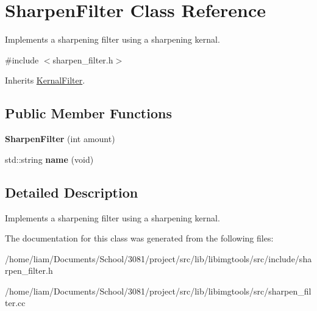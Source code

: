 \hypertarget{classSharpenFilter}{}\section{Sharpen\+Filter Class Reference}
\label{classSharpenFilter}


Implements a sharpening filter using a sharpening kernal.  




{\ttfamily \#include $<$sharpen\+\_\+filter.\+h$>$}



Inherits \hyperlink{classKernalFilter}{Kernal\+Filter}.

\subsection*{Public Member Functions}
\begin{DoxyCompactItemize}
\item 
{\bfseries Sharpen\+Filter} (int amount)\hypertarget{classSharpenFilter_a38c0d866df1c39cfef3e0011dfbc0119}{}\label{classSharpenFilter_a38c0d866df1c39cfef3e0011dfbc0119}

\item 
std\+::string {\bfseries name} (void)\hypertarget{classSharpenFilter_ae58f07217d5be27c357364a935b3af2c}{}\label{classSharpenFilter_ae58f07217d5be27c357364a935b3af2c}

\end{DoxyCompactItemize}


\subsection{Detailed Description}
Implements a sharpening filter using a sharpening kernal. 

The documentation for this class was generated from the following files\+:\begin{DoxyCompactItemize}
\item 
/home/liam/\+Documents/\+School/3081/project/src/lib/libimgtools/src/include/sharpen\+\_\+filter.\+h\item 
/home/liam/\+Documents/\+School/3081/project/src/lib/libimgtools/src/sharpen\+\_\+filter.\+cc\end{DoxyCompactItemize}
